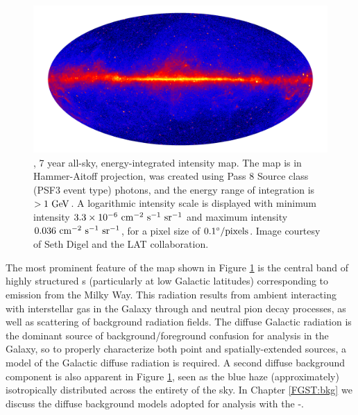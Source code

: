 \begin{figure}[!ht]
	\hspace{-2.7cm}
	\includegraphics[width=1.3\columnwidth]{Figures/intens_ait_84m_gt1000_psf3_gal_0p1_transparent.png}
	\caption[LAT 7 year, all-sky intensity map]{\lat{}, 7 year all-sky, energy-integrated intensity map. The map is in Hammer-Aitoff projection, was created using Pass 8 Source class (PSF3 event type) photons, and the energy range of integration is $> 1~\mathrm{GeV}{}$. A logarithmic intensity scale is displayed with minimum intensity ${\rm 3.3 \times  10^{-6} ~cm^{-2}~ s^{-1}~sr^{-1}}$ and maximum intensity ${\rm 0.036 ~cm^{-2}~s^{-1}~sr^{-1}}$, for a pixel size of ${\rm 0.1^\circ / pixels}$. Image courtesy of Seth Digel and the LAT collaboration.
		\label{fig:7yearSkyMap}}
\end{figure}

The most prominent feature of the map shown in Figure \ref{fig:7yearSkyMap} is the central band of highly structured \gam{}s (particularly at low Galactic latitudes) corresponding to emission from the Milky Way. This radiation results from ambient \crs{} interacting with interstellar gas in the Galaxy through \brems{} and neutral pion decay processes, as well as \ic{} scattering of background radiation fields. The diffuse Galactic radiation is the dominant source of background/foreground confusion for \gam{} analysis in the Galaxy, so to properly characterize both point and spatially-extended \gam{} sources, a  model of the Galactic diffuse radiation is required. A second diffuse \gam{} background component is also apparent in Figure \ref{fig:7yearSkyMap}, seen as the blue haze (approximately) isotropically distributed across the entirety of the sky. In Chapter \ref{FGST:bkg} we discuss the diffuse background models adopted for \gam{} analysis with the \Fermi{}-\lat{}.

